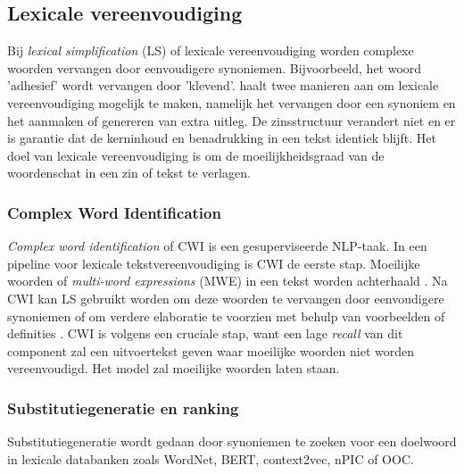 \subsection{Lexicale vereenvoudiging}

Bij \textit{lexical simplification} (LS) of lexicale vereenvoudiging worden complexe woorden vervangen door eenvoudigere synoniemen. Bijvoorbeeld, het woord 'adhesief' wordt vervangen door 'klevend'. \textcite{Kandula2010} haalt twee manieren aan om lexicale vereenvoudiging mogelijk te maken, namelijk het vervangen door een synoniem en het aanmaken of genereren van extra uitleg. De zinsstructuur verandert niet en er is garantie dat de kerninhoud en benadrukking in een tekst identiek blijft. Het doel van lexicale vereenvoudiging is om de moeilijkheidsgraad van de woordenschat in een zin of tekst te verlagen. 


\subsubsection{Complex Word Identification}

\textit{Complex word identification} of CWI is een gesuperviseerde NLP-taak. In een pipeline voor lexicale tekstvereenvoudiging is CWI de eerste stap. Moeilijke woorden of \textit{multi-word expressions} (MWE) in een tekst worden achterhaald  \autocite{Shardlow2013, Gooding2019}. Na CWI kan LS gebruikt worden om deze woorden te vervangen door eenvoudigere synoniemen of om verdere elaboratie te voorzien met behulp van voorbeelden of definities \autocite{Zeng2005, Kandula2010}. CWI is volgens \textcite{Shardlow2013} een cruciale stap, want een lage \textit{recall} van dit component zal een uitvoertekst geven waar moeilijke woorden niet worden vereenvoudigd. Het model zal moeilijke woorden laten staan.

\subsubsection{Substitutiegeneratie en ranking}

Substitutiegeneratie wordt gedaan door synoniemen te zoeken voor een doelwoord in lexicale databanken zoals WordNet, BERT, context2vec, nPIC of OOC. 

